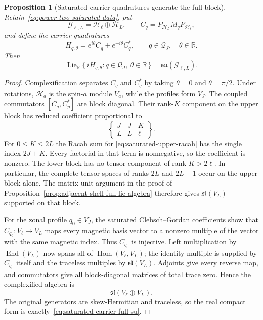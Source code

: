\documentclass[11pt]{article}
\newtheorem{proposition}[theorem]{Proposition}
\theoremstyle{remark}
\begin{document}
\begin{proposition}[Saturated carrier quadratures generate the full block]
\label{prop:saturated-carrier-full-su}
Retain~\eqref{eq:power-two-saturated-data}, put
\[
 \mathcal G_{\ell,L}=\mathcal H_\ell\oplus\mathcal H_L,\qquad
 C_q=P_{\mathcal H_L}M_qP_{\mathcal H_\ell},
\]
and define the carrier quadratures
\begin{equation}
 H_{q,\theta}=e^{i\theta}C_q+e^{-i\theta}C_q^\ast,
 \qquad q\in\mathcal Q_J,\quad\theta\in\mathbb R.
 \label{eq:saturated-carrier-quadratures}
\end{equation}
Then
\begin{equation}
 \operatorname{Lie}_{\mathbb R}
 \{\,iH_{q,\theta}:q\in\mathcal Q_J,\ \theta\in\mathbb R\,\}
 =
 \mathfrak{su}(\mathcal G_{\ell,L}).
 \label{eq:saturated-carrier-full-su}
\end{equation}
\end{proposition}

\begin{proof}
Complexification separates $C_q$ and $C_q^\ast$ by taking
$\theta=0$ and $\theta=\pi/2$.  Under rotations,
$\mathcal H_a$ is the spin-$a$ module $V_a$, while the profiles form $V_J$.
The coupled commutators $[C_q,C_p^\ast]$ are block diagonal.  Their rank-$K$
component on the upper block has reduced coefficient proportional to
\begin{equation}
 \begin{Bmatrix}
  J&J&K\\ L&L&\ell
 \end{Bmatrix}.
 \label{eq:saturated-upper-racah}
\end{equation}
For $0\leq K\leq2L$ the Racah sum for
\eqref{eq:saturated-upper-racah} has the single index $2J+K$.
Every factorial in that term is nonnegative, so the coefficient is nonzero.
The lower block has no tensor component of rank $K>2\ell$.
In particular, the complete tensor spaces of ranks $2L$ and $2L-1$ occur
on the upper block alone.  The matrix-unit argument in the proof of
Proposition~\ref{prop:adjacent-shell-full-lie-algebra} therefore gives
$\mathfrak{sl}(V_L)$ supported on that block.

For the zonal profile $q_0\in V_J$, the saturated Clebsch--Gordan
coefficients show that $C_{q_0}:V_\ell\to V_L$ maps every magnetic basis
vector to a nonzero multiple of the vector with the same magnetic index.
Thus $C_{q_0}$ is injective.  Left multiplication by
$\operatorname{End}(V_L)$ now spans all of
$\operatorname{Hom}(V_\ell,V_L)$; the identity multiple is supplied by
$C_{q_0}$ itself and the traceless multiples by
$\mathfrak{sl}(V_L)$.  Adjoints give every reverse map, and commutators give
all block-diagonal matrices of total trace zero.  Hence the complexified
algebra is
\[
 \mathfrak{sl}(V_\ell\oplus V_L).
\]
The original generators are skew-Hermitian and traceless, so the real
compact form is exactly~\eqref{eq:saturated-carrier-full-su}.
\end{proof}
\end{document}

